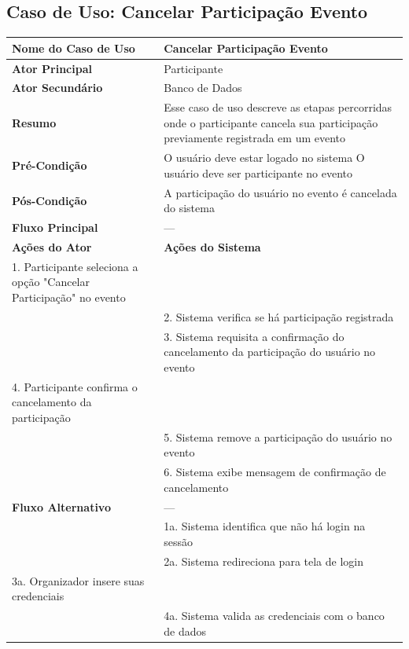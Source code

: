 \documentclass[12pt,a4paper]{article}
\begin{document}
\vspace{1cm}

\newpage

\subsection{Caso de Uso: Cancelar Participação Evento}
\begin{longtable}{|p{4cm}|p{11cm}|}
\hline
\textbf{Nome do Caso de Uso} & Cancelar Participação Evento \\ \hline
\textbf{Ator Principal} & Participante \\ \hline
\textbf{Ator Secundário} & Banco de Dados \\ \hline
\textbf{Resumo} & Esse caso de uso descreve as etapas percorridas onde o participante cancela sua participação previamente registrada em um evento \\ \hline
\textbf{Pré-Condição} & O usuário deve estar logado no sistema \newline O usuário deve ser participante no evento \\ \hline
\textbf{Pós-Condição} & A participação do usuário no evento é cancelada do sistema \\ \hline
\textbf{Fluxo Principal} & --- \\ \hline
\textbf{Ações do Ator} & \textbf{Ações do Sistema} \\ \hline
1. Participante seleciona a opção "Cancelar Participação" no evento & \\ \hline
& 2. Sistema verifica se há participação registrada \\ \hline
& 3. Sistema requisita a confirmação do cancelamento da participação do usuário no evento \\ \hline
4. Participante confirma o cancelamento da participação & \\ \hline
& 5. Sistema remove a participação do usuário no evento \\ \hline
& 6. Sistema exibe mensagem de confirmação de cancelamento \\ \hline
\textbf{Fluxo Alternativo} & --- \\ \hline
& 1a. Sistema identifica que não há login na sessão \\ \hline
& 2a. Sistema redireciona para tela de login \\ \hline
3a. Organizador insere suas credenciais & \\ \hline
& 4a. Sistema valida as credenciais com o banco de dados \\ \hline

\end{longtable}
\end{document}

